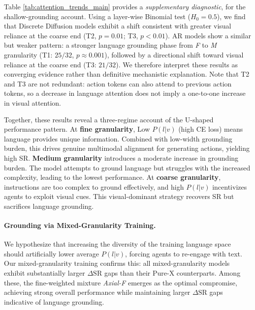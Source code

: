 \documentclass[11pt]{article}
\begin{document}
Table \ref{tab:attention_trends_main} provides a \emph{supplementary diagnostic}, for the shallow-grounding account. Using a layer-wise Binomial test ($H_0=0.5$), we find that Discrete Diffusion models exhibit a shift consistent with greater visual reliance at the coarse end (T2, $p=0.01$; T3, $p<0.01$). AR models show a similar but weaker pattern: a stronger language grounding phase from \emph{F} to \emph{M} granularity (T1: $25/32$, $p \approx 0.001$), followed by a directional shift toward visual reliance at the coarse end (T3: $21/32$). We therefore interpret these results as converging evidence rather than definitive mechanistic explanation. Note that T2 and T3 are not redundant: action tokens can also attend to previous action tokens, so a decrease in language attention does not imply a one-to-one increase in visual attention. 
 
Together, these results reveal a three-regime account of the U-shaped performance pattern. At \textbf{fine granularity}, Low $P(l|v)$ (high CE loss) means language provides unique information. Combined with low-width grounding burden, this drives genuine multimodal alignment for generating actions, yielding high SR. \textbf{Medium granularity} introduces a moderate increase in grounding burden. The model attempts to ground language but struggles with the increased complexity, leading to the lowest performance. At \textbf{coarse granularity}, instructions are too complex to ground effectively, and high $P(l|v)$ incentivizes agents to exploit visual cues. This visual-dominant strategy recovers SR but sacrifices language grounding.

\paragraph{Grounding via Mixed-Granularity Training.}
We hypothesize that increasing the diversity of the training language space should artificially lower average $P(l|v)$, forcing agents to re-engage with text. Our mixed-granularity training confirms this: all mixed-granularity models exhibit substantially larger $\Delta\mathrm{SR}$ gaps than their Pure-X counterparts. Among these, the fine-weighted mixture \emph{Axial-F} emerges as the optimal compromise, achieving strong overall performance while maintaining larger $\Delta\mathrm{SR}$ gaps indicative of language grounding.
\end{document}
